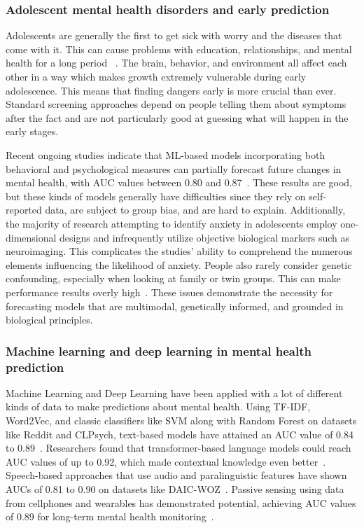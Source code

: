 \documentclass[10pt,letterpaper]{article}
\begin{document}
\subsubsection*{Adolescent mental health disorders and early prediction}
Adolescents are generally the first to get sick with worry and the diseases that come with it. This can cause problems with education, relationships, and mental health for a long period ~\cite{ref36,ref37}. The brain, behavior, and environment all affect each other in a way which makes growth extremely vulnerable during early adolescence. This means that finding dangers early is more crucial than ever. Standard screening approaches depend on people telling them about symptoms after the fact and are not particularly good at guessing what will happen in the early stages.

Recent ongoing studies indicate that ML-based models incorporating both behavioral and psychological measures can partially forecast future changes in mental health, with AUC values between 0.80 and 0.87~\cite{ref18,ref19}. These results are good, but these kinds of models generally have difficulties since they rely on self-reported data, are subject to group bias, and are hard to explain. Additionally, the majority of research attempting to identify anxiety in adolescents employ one-dimensional designs and infrequently utilize objective biological markers such as neuroimaging. This complicates the studies' ability to comprehend the numerous elements influencing the likelihood of anxiety. People also rarely consider genetic confounding, especially when looking at family or twin groups. This can make performance results overly high~\cite{ref32,ref33}. These issues demonstrate the necessity for forecasting models that are multimodal, genetically informed, and grounded in biological principles.

\subsubsection*{Machine learning and deep learning in mental health prediction}

Machine Learning and Deep Learning have been applied with a lot of different kinds of data to make predictions about mental health. Using TF-IDF, Word2Vec, and classic classifiers like SVM along with Random Forest on datasets like Reddit and CLPsych, text-based models have attained an AUC value of 0.84 to 0.89~\cite{ref11,ref13}. Researchers found that transformer-based language models could reach AUC values of up to 0.92, which made contextual knowledge even better~\cite{ref17}. Speech-based approaches that use audio and paralinguistic features have shown AUCs of 0.81 to 0.90 on datasets like DAIC-WOZ~\cite{ref14}. Passive sensing using data from cellphones and wearables has demonstrated potential, achieving AUC values of 0.89 for long-term mental health monitoring~\cite{ref9,ref12}.
\end{document}
